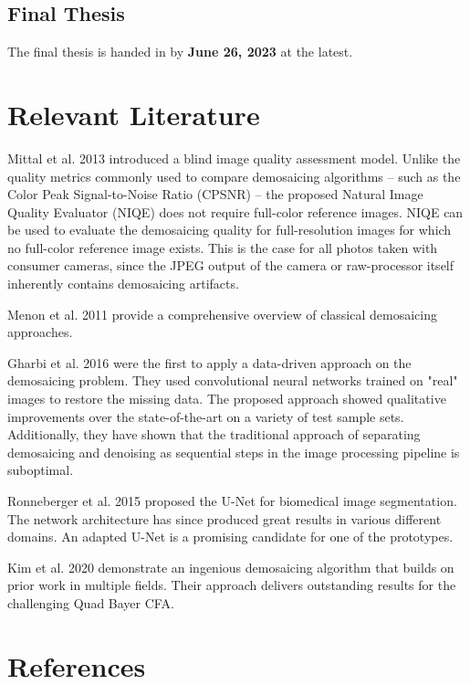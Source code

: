 \documentclass[english,notitlepage,smartquotes]{hgbreport}
\begin{document}
\subsection{Final Thesis}

The final thesis is handed in by \textbf{June 26, 2023} at the latest.

\section{Relevant Literature}

Mittal et al. 2013 \cite{Mittal2013} introduced a blind image quality assessment model. Unlike the quality metrics commonly used to compare demosaicing algorithms -- such as the Color Peak Signal-to-Noise Ratio (CPSNR) \cite{Menon2011} -- the proposed Natural Image Quality Evaluator (NIQE) does not require full-color reference images. NIQE can be used to evaluate the demosaicing quality for full-resolution images for which no full-color reference image exists. This is the case for all photos taken with consumer cameras, since the JPEG output of the camera or raw-processor itself inherently contains demosaicing artifacts.

Menon et al. 2011 \cite{Menon2011} provide a comprehensive overview of classical demosaicing approaches.

Gharbi et al. 2016 \cite{Gharbi2016} were the first to apply a data-driven approach on the demosaicing problem. They used convolutional neural networks trained on "real" images to restore the missing data. The proposed approach showed qualitative improvements over the state-of-the-art on a variety of test sample sets. Additionally, they have shown that the traditional approach of separating demosaicing and denoising as sequential steps in the image processing pipeline is suboptimal.

Ronneberger et al. 2015 \cite{Ronneberger2015} proposed the U-Net for biomedical image segmentation. The network architecture has since produced great results in various different domains. An adapted U-Net is a promising candidate for one of the prototypes.

Kim et al. 2020 \cite{Kim2020} demonstrate an ingenious demosaicing algorithm that builds on prior work in multiple fields. Their approach delivers outstanding results for the challenging Quad Bayer CFA.

  
\section*{References}

\printbibliography[heading=noheader]

\end{document}
